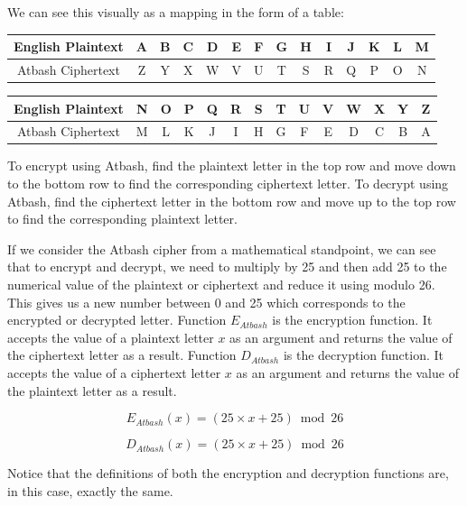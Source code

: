 We can see this visually as a mapping in the form of a table:

\Large
\begin{center}
  \begin{tabular}{|c|c|c|c|c|c|c|c|c|c|c|c|c|c|}
  \hline
    English Plaintext & A & B & C & D & E & F & G & H & I & J & K & L & M \\ \hline
	Atbash Ciphertext & Z & Y & X & W & V & U & T & S & R & Q & P & O & N \\ \hline
  \end{tabular}
\end{center}

\begin{center}
  \begin{tabular}{|c|c|c|c|c|c|c|c|c|c|c|c|c|c|}
  \hline
    English Plaintext & N & O & P & Q & R & S & T & U & V & W & X & Y & Z \\ \hline
    Atbash Ciphertext & M & L & K & J & I & H & G & F & E & D & C & B & A \\ \hline
  \end{tabular}
\end{center}

\normalsize

To encrypt using Atbash, find the plaintext letter in the top row and move down to the bottom row to find the corresponding ciphertext letter. To decrypt using Atbash, find the ciphertext letter in the bottom row and move up to the top row to find the corresponding plaintext letter.

If we consider the Atbash cipher from a mathematical standpoint, we can see that to encrypt and decrypt, we need to multiply by 25 and then add 25 to the numerical value of the plaintext or ciphertext and reduce it using modulo 26. This gives us a new number between 0 and 25 which corresponds to the encrypted or decrypted letter. Function $E_{Atbash}$ is the encryption function. It accepts the value of a plaintext letter $x$ as an argument and returns the value of the ciphertext letter as a result. Function $D_{Atbash}$ is the decryption function. It accepts the value of a ciphertext letter $x$ as an argument and returns the value of the plaintext letter as a result.

\[
  E_{Atbash}(x) = (25 \times x + 25) \bmod 26
\]

\[
  D_{Atbash}(x) = (25 \times x + 25) \bmod 26
\]

Notice that the definitions of both the encryption and decryption functions are, in this case, exactly the same.


